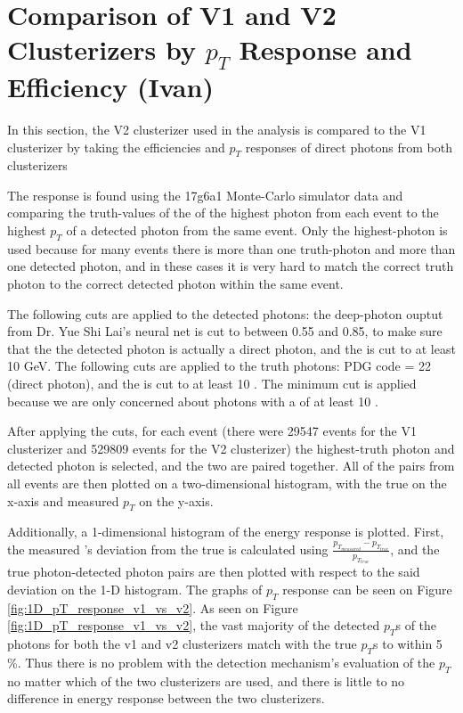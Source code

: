 

\section{Comparison of V1 and V2 Clusterizers by $p_T$ Response and Efficiency (Ivan)}

In this section, the V2 clusterizer used in the analysis is compared to the V1 clusterizer by taking the efficiencies and $p_T$ responses of direct photons from both clusterizers

The \pt response is found using the 17g6a1 Monte-Carlo simulator data and comparing the truth-values of the \pt of the highest \pt photon from each event to the highest $p_T$ of a detected photon from the same event. Only the highest-\pt photon is used because for many events there is more than one truth-photon and more than one detected photon, and in these cases it is very hard to match the correct truth photon to the correct detected photon within the same event.

The following cuts are applied to the detected photons: the deep-photon ouptut from Dr. Yue Shi Lai's neural net is cut to  between 0.55 and 0.85, to make sure that the the detected photon is actually a direct photon, and the \pt is cut to at least 10 GeV. The following cuts are applied to the truth photons: PDG code = 22 (direct photon), and the \pt is cut to at least 10 \GeVc. The \pt minimum cut is applied because we are only concerned about photons with a \pt of at least 10 \GeVc.

After applying the cuts, for each event (there were 29547 events for the V1 clusterizer and 529809 events for the V2 clusterizer) the highest-\pt truth photon and detected photon is selected, and the two are paired together. All of the pairs from all events are then plotted on a two-dimensional histogram, with the true \pt on the x-axis and measured $p_T$ on the y-axis.

Additionally, a 1-dimensional histogram of the energy response is plotted. First, the measured \pt's deviation from the true \pt is calculated using $\frac{p_{T_{measured}}-p_{T_{true}}}{p_{T_{true}}}$, and the true photon-detected photon pairs are then plotted with respect to the said deviation on the 1-D histogram. The graphs of $p_T$ response can be seen on Figure \ref{fig:1D_pT_response_v1_vs_v2}. As seen on Figure \ref{fig:1D_pT_response_v1_vs_v2}, the vast majority of the detected $p_T$s of the photons for both the v1 and v2 clusterizers match with the true $p_T$s to within 5 \%. Thus there is no problem with the detection mechanism's evaluation of the $p_T$ no matter which of the two clusterizers are used, and there is little to no difference in energy response between the two clusterizers.

